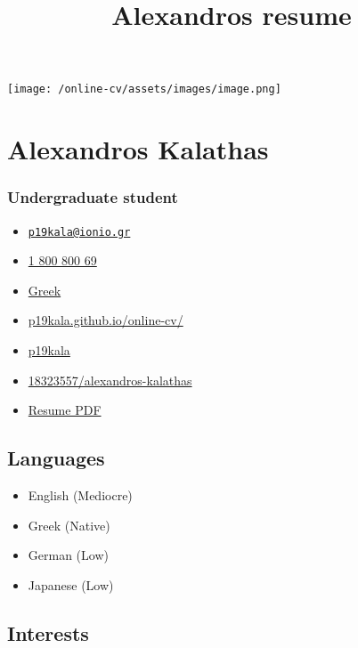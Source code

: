 \documentclass[]{article}
\title{Alexandros resume}
\date{}
\providecommand{\tightlist}{%
  \setlength{\itemsep}{0pt}\setlength{\parskip}{0pt}}
\begin{document}
\maketitle

\texttt{[image: /online-cv/assets/images/image.png]}

\section{Alexandros Kalathas}\label{alexandros-kalathas}

\subsubsection{Undergraduate student}\label{undergraduate-student}

\begin{itemize}
\tightlist
\item
  \emph{} \href{mailto:p19kala@ionio.gr}{\nolinkurl{p19kala@ionio.gr}}
\item
  \emph{} \href{tel:1\%20800\%20800\%2069}{1 800 800 69}
\item
  \emph{} \href{}{Greek}
\item
  \emph{}
  \href{http://p19kala.github.io/online-cv/}{p19kala.github.io/online-cv/}
\item
  \emph{} \href{http://github.com/p19kala}{p19kala}
\item
  \emph{}
  \href{https://stackoverflow.com/users/18323557/alexandros-kalathas}{18323557/alexandros-kalathas}
\item
  \emph{}
  \href{https://raw.githubusercontent.com/p19kala/online-cv/gh-pages/assets/Alexandros-resume.pdf}{Resume
  PDF}
\end{itemize}

\subsection{Languages}\label{languages}

\begin{itemize}
\tightlist
\item
  English {(Mediocre)}
\item
  Greek {(Native)}
\item
  German {(Low)}
\item
  Japanese {(Low)}
\end{itemize}

\subsection{Interests}\label{interests}
\end{document}
